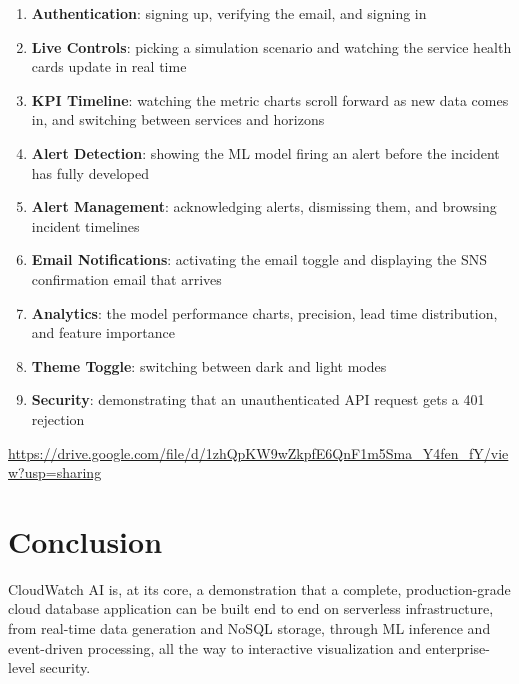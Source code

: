 \documentclass[11pt,a4paper]{article}
\begin{document}
\begin{enumerate}[leftmargin=2em]
    \item \textbf{Authentication}: signing up, verifying the email, and signing in
    \item \textbf{Live Controls}: picking a simulation scenario and watching the service health cards update in real time
    \item \textbf{KPI Timeline}: watching the metric charts scroll forward as new data comes in, and switching between services and horizons
    \item \textbf{Alert Detection}: showing the ML model firing an alert before the incident has fully developed
    \item \textbf{Alert Management}: acknowledging alerts, dismissing them, and browsing incident timelines
    \item \textbf{Email Notifications}: activating the email toggle and displaying the SNS confirmation email that arrives
    \item \textbf{Analytics}: the model performance charts, precision, lead time distribution, and feature importance
    \item \textbf{Theme Toggle}: switching between dark and light modes
    \item \textbf{Security}: demonstrating that an unauthenticated API request gets a 401 rejection
\end{enumerate}

\begin{warnbox}
\url{https://drive.google.com/file/d/1zhQpKW9wZkpfE6QnF1m5Sma_Y4fen_fY/view?usp=sharing}
\end{warnbox}

\section{Conclusion}

CloudWatch AI is, at its core, a demonstration that a complete, production-grade cloud database application can be built end to end on serverless infrastructure, from real-time data generation and NoSQL storage, through ML inference and event-driven processing, all the way to interactive visualization and enterprise-level security.
\end{document}
